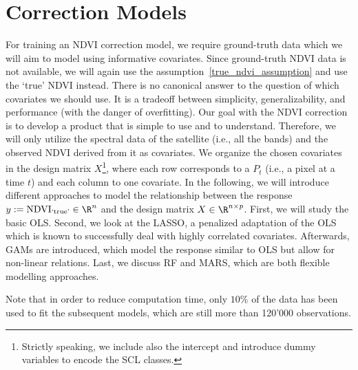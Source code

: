 \section{Correction Models}{
        \label{sec:corr_data_table}
        \label{sec:corr_methods}

    For training an NDVI correction model, we require ground-truth data which we will aim to model using informative covariates. Since ground-truth NDVI data is not available, we will again use the assumption~\ref{true_ndvi_assumption} and use the `true' NDVI instead. There is no canonical answer to the question of which covariates we should use. It is a tradeoff between simplicity, generalizability, and performance (with the danger of overfitting). 
    Our goal with the NDVI correction is to develop a product that is simple to use and to understand. Therefore, we will only utilize the spectral data of the satellite (i.e., all the bands) and the observed NDVI derived from it as covariates. We organize the chosen covariates in the design matrix $X$\footnote{Strictly speaking, we include also the intercept and introduce  dummy variables to encode the SCL classes.}, where each row corresponds to a $P_t$ (i.e., a pixel at a time $t$) and each column to one covariate.    
    In the following, we will introduce different approaches to model the relationship between the response $y:=\operatorname{NDVI}_\text{`true'}\in \R^n$ and the design matrix $X\in\R^{n \times p}$. First, we will study the basic OLS. Second, we look at the LASSO, a penalized adaptation of the OLS which is known to successfully deal with highly correlated covariates. Afterwards, GAMs are introduced, which model the response similar to OLS but allow for non-linear relations. Last, we discuss RF and MARS, which are both flexible modelling approaches. %

    Note that in order to reduce computation time, only $10\%$ of the data has been used to fit the subsequent models, which are still more than 120'000 observations. 
    
    
}

